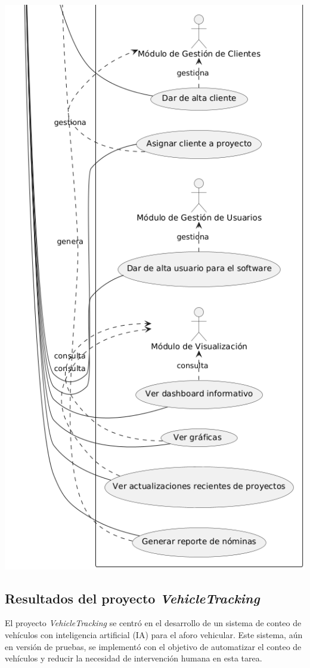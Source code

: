 \documentclass[protocolo.tex]{subfiles}
\begin{document}
\includegraphics[scale=0.7]{Imagenes/datafirept3.png}


\subsection{Resultados del proyecto \textit{VehicleTracking}}

El proyecto  \textit{VehicleTracking} se centró en el desarrollo de un sistema de conteo de vehículos con inteligencia artificial (IA) para el aforo vehicular.  Este sistema, aún en versión de pruebas, se implementó con el objetivo de automatizar el conteo de vehículos y reducir la necesidad de intervención humana en esta tarea.\vspace{4mm}
\end{document}

